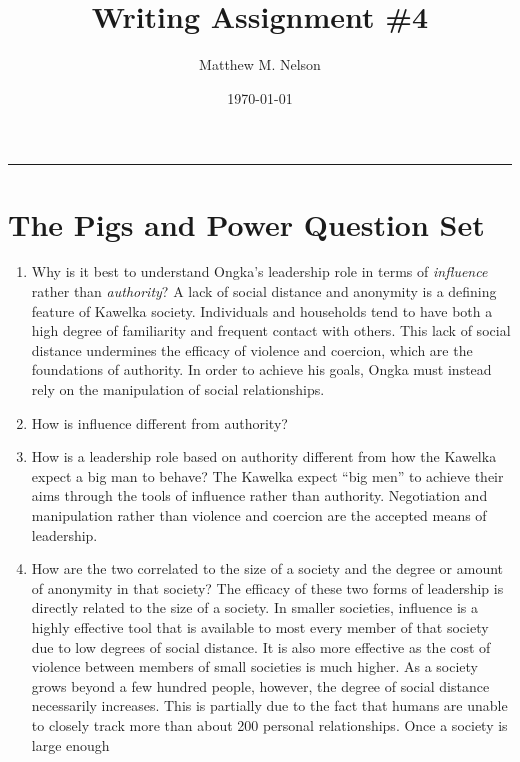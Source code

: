 \documentclass[12pt]{article}
\author{Matthew M. Nelson}
\date{\today}
\title{Writing Assignment \#4}
\begin{document}
\maketitle

\noindent\rule{\textwidth}{0.5pt}
\section{The Pigs and Power Question Set}
\label{sec:orgc6b2f78}
\begin{enumerate}
\item Why is it best to understand Ongka's leadership role in terms of \emph{influence} rather than \emph{authority}?
\label{sec:orgd253388}
A lack of social distance and anonymity is a defining feature of Kawelka
society. Individuals and households tend to have both a high degree of
familiarity and frequent contact with others. This lack of social distance
undermines the efficacy of violence and coercion, which are the foundations of
authority. In order to achieve his goals, Ongka must instead rely on the
manipulation of social relationships.
\item How is influence different from authority?
\label{sec:orgbd21d1f}
\item How is a leadership role based on authority different from how the Kawelka expect a big man to behave?
\label{sec:orga41c522}
The Kawelka expect ``big men'' to achieve their aims through the tools of
influence rather than authority. Negotiation and manipulation rather than
violence and coercion are the accepted means of leadership.
\item How are the two correlated to the size of a society and the degree or amount of anonymity in that society?
\label{sec:orgd19611f}
The efficacy of these two forms of leadership is directly related to the size of
a society. In smaller societies, influence is a highly effective tool that is
available to most every member of that society due to low degrees of social
distance. It is also more effective as the cost of violence between members of
small societies is much higher. As a society grows beyond a few hundred people,
however, the degree of social distance necessarily increases. This is partially
due to the fact that humans are unable to closely track more than about 200
personal relationships. Once a society is large enough
\end{enumerate}
\end{document}
